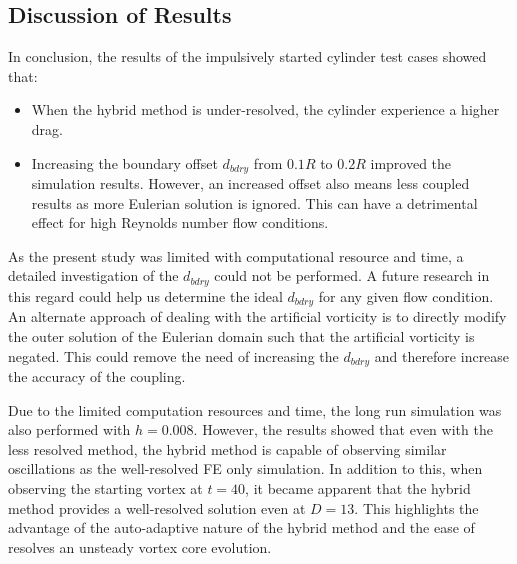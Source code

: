 \subsection{Discussion of Results}	

In conclusion, the results of the impulsively started cylinder test cases showed that:
\begin{itemize}
\item When the hybrid method is under-resolved, the cylinder experience a higher drag.
\item Increasing the boundary offset $d_{bdry}$ from $0.1R$ to $0.2R$ improved the simulation results. However, an increased offset also means less coupled results as more Eulerian solution is ignored. This can have a detrimental effect for high Reynolds number flow conditions.
\end{itemize}

As the present study was limited with computational resource and time, a detailed investigation of the $d_{bdry}$ could not be performed. A future research in this regard could help us determine the ideal $d_{bdry}$ for any given flow condition. An alternate approach of dealing with the artificial vorticity is to directly modify the outer solution of the Eulerian domain such that the artificial vorticity is negated. This could remove the need of increasing the $d_{bdry}$ and therefore increase the accuracy of the coupling.

Due to the limited computation resources and time, the long run simulation was also performed with $h=0.008$. However, the results showed that even with the less resolved method, the hybrid method is capable of observing similar oscillations as the well-resolved FE only simulation. In addition to this, when observing the starting vortex at $t=40$, it became apparent that the hybrid method provides a well-resolved solution even at $D=13$. This highlights the advantage of the auto-adaptive nature of the hybrid method and the ease of resolves an unsteady vortex core evolution.





